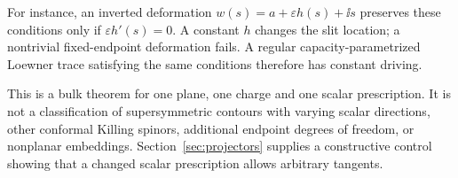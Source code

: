 For instance, an inverted deformation
$w(s)=a+\varepsilon h(s)+\ii s$ preserves these conditions only if
$\varepsilon h'(s)=0$. A constant $h$ changes the slit location;
a nontrivial fixed-endpoint deformation fails. A regular
capacity-parametrized Loewner trace satisfying the same conditions
therefore has constant driving.

This is a bulk theorem for one plane, one charge and one scalar
prescription. It is not a classification of supersymmetric contours
with varying scalar directions, other conformal Killing spinors,
additional endpoint degrees of freedom, or nonplanar embeddings.
Section~\ref{sec:projectors} supplies a constructive control showing
that a changed scalar prescription allows arbitrary tangents.
